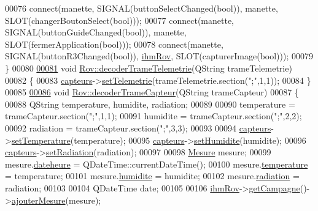 \begin{DoxyCode}
00076     connect(manette, SIGNAL(buttonSelectChanged(\textcolor{keywordtype}{bool})), manette, SLOT(changerBoutonSelect(\textcolor{keywordtype}{bool})));
00077     connect(manette, SIGNAL(buttonGuideChanged(\textcolor{keywordtype}{bool})), manette, SLOT(fermerApplication(\textcolor{keywordtype}{bool})));
00078     connect(manette, SIGNAL(buttonR3Changed(\textcolor{keywordtype}{bool})), \hyperlink{class_rov_a9b1c1c3b4e268a32e69b2ea4c863b817}{ihmRov}, SLOT(capturerImage(\textcolor{keywordtype}{bool})));
00079 \}
00080 
\hyperlink{class_rov_a0d51099f9e1991ceffa0b6ed4a1c4e2e}{00081} \textcolor{keywordtype}{void} \hyperlink{class_rov_a0d51099f9e1991ceffa0b6ed4a1c4e2e}{Rov::decoderTrameTelemetrie}(QString trameTelemetrie)
00082 \{
00083     \hyperlink{class_rov_a1b34d63d505da660be27b75ad93754c3}{capteurs}->\hyperlink{class_capteurs_a399af986afb9d707138bc57a51e1f34f}{setTelemetrie}(trameTelemetrie.section(\textcolor{stringliteral}{";"},1,1));
00084 \}
00085 
\hyperlink{class_rov_ac1780c0484f427807f6207d17b564221}{00086} \textcolor{keywordtype}{void} \hyperlink{class_rov_ac1780c0484f427807f6207d17b564221}{Rov::decoderTrameCapteur}(QString trameCapteur)
00087 \{
00088     QString temperature, humidite, radiation;
00089 
00090     temperature = trameCapteur.section(\textcolor{stringliteral}{";"},1,1);
00091     humidite = trameCapteur.section(\textcolor{stringliteral}{";"},2,2);
00092     radiation = trameCapteur.section(\textcolor{stringliteral}{";"},3,3);
00093 
00094     \hyperlink{class_rov_a1b34d63d505da660be27b75ad93754c3}{capteurs}->\hyperlink{class_capteurs_a8d6a0bceb4d236edf7b51335d9be8ecd}{setTemperature}(temperature);
00095     \hyperlink{class_rov_a1b34d63d505da660be27b75ad93754c3}{capteurs}->\hyperlink{class_capteurs_aafb06e1746006cdb72e92dc7a0519a2e}{setHumidite}(humidite);
00096     \hyperlink{class_rov_a1b34d63d505da660be27b75ad93754c3}{capteurs}->\hyperlink{class_capteurs_a8692d145188df3129d88fef77efbb7b0}{setRadiation}(radiation);
00097 
00098     \hyperlink{struct_mesure}{Mesure} mesure;
00099     mesure.\hyperlink{struct_mesure_a9958b0440aca6af40028e742123afd9e}{dateheure} = QDateTime::currentDateTime();
00100     mesure.\hyperlink{struct_mesure_ad0dba8933e4b65b3781be7811f0f86ac}{temperature} = temperature;
00101     mesure.\hyperlink{struct_mesure_ad354ba4d8a32c05600859c76a8af0282}{humidite} = humidite;
00102     mesure.\hyperlink{struct_mesure_a1dae237cf09302d426ea375b9afb12f7}{radiation} = radiation;
00103 
00104     QDateTime date;
00105 
00106     \hyperlink{class_rov_a9b1c1c3b4e268a32e69b2ea4c863b817}{ihmRov}->\hyperlink{class_i_h_m_rov_ab3e8686eef9233b4c1e6711cf1c4576a}{getCampagne}()->\hyperlink{class_campagne_ab301ceaacbe1186682c2b6f3282619d0}{ajouterMesure}(mesure);

\end{DoxyCode}
